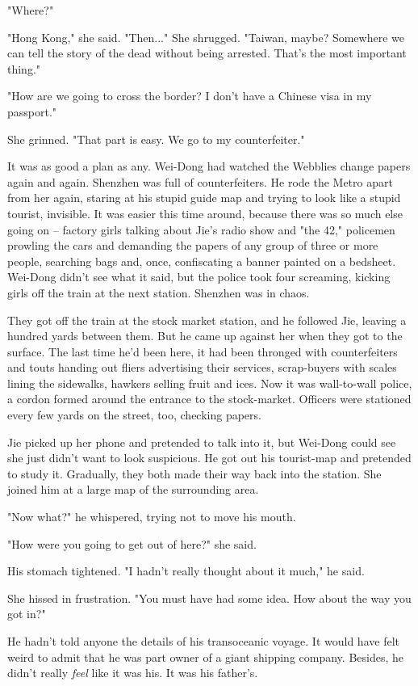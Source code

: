 "Where?"

"Hong Kong," she said. "Then..." She shrugged. "Taiwan, maybe?
Somewhere we can tell the story of the dead without being arrested.
That's the most important thing."

"How are we going to cross the border? I don't have a Chinese visa
in my passport."

She grinned. "That part is easy. We go to my counterfeiter."

It was as good a plan as any. Wei-Dong had watched the Webblies
change papers again and again. Shenzhen was full of counterfeiters.
He rode the Metro apart from her again, staring at his stupid guide
map and trying to look like a stupid tourist, invisible. It was
easier this time around, because there was so much else going on --
factory girls talking about Jie's radio show and "the 42,"
policemen prowling the cars and demanding the papers of any group
of three or more people, searching bags and, once, confiscating a
banner painted on a bedsheet. Wei-Dong didn't see what it said, but
the police took four screaming, kicking girls off the train at the
next station. Shenzhen was in chaos.

They got off the train at the stock market station, and he followed
Jie, leaving a hundred yards between them. But he came up against
her when they got to the surface. The last time he'd been here, it
had been thronged with counterfeiters and touts handing out fliers
advertising their services, scrap-buyers with scales lining the
sidewalks, hawkers selling fruit and ices. Now it was wall-to-wall
police, a cordon formed around the entrance to the stock-market.
Officers were stationed every few yards on the street, too,
checking papers.

Jie picked up her phone and pretended to talk into it, but Wei-Dong
could see she just didn't want to look suspicious. He got out his
tourist-map and pretended to study it. Gradually, they both made
their way back into the station. She joined him at a large map of
the surrounding area.

"Now what?" he whispered, trying not to move his mouth.

"How were you going to get out of here?" she said.

His stomach tightened. "I hadn't really thought about it much," he
said.

She hissed in frustration. "You must have had some idea. How about
the way you got in?"

He hadn't told anyone the details of his transoceanic voyage. It
would have felt weird to admit that he was part owner of a giant
shipping company. Besides, he didn't really \emph{feel} like it was
his. It was his father's.

